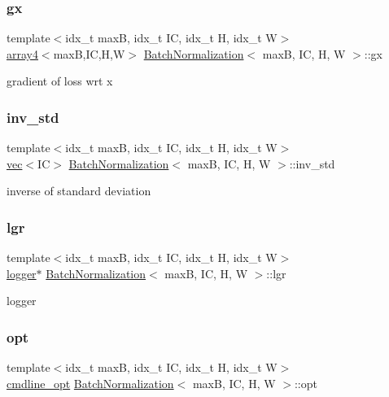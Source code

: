 \subsubsection{\texorpdfstring{gx}{gx}}
{\footnotesize\ttfamily template$<$idx\+\_\+t maxB, idx\+\_\+t IC, idx\+\_\+t H, idx\+\_\+t W$>$ \\
\hyperlink{structarray4}{array4}$<$maxB,IC,H,W$>$ \hyperlink{structBatchNormalization}{Batch\+Normalization}$<$ maxB, IC, H, W $>$\+::gx}

gradient of loss wrt x \mbox{\label{structBatchNormalization_a32b254c9c4ceb4dc1c952d93851d120f}} 
\subsubsection{\texorpdfstring{inv\+\_\+std}{inv\_std}}
{\footnotesize\ttfamily template$<$idx\+\_\+t maxB, idx\+\_\+t IC, idx\+\_\+t H, idx\+\_\+t W$>$ \\
\hyperlink{structvec}{vec}$<$IC$>$ \hyperlink{structBatchNormalization}{Batch\+Normalization}$<$ maxB, IC, H, W $>$\+::inv\+\_\+std}

inverse of standard deviation \mbox{\label{structBatchNormalization_a160b18a54054d8afa967acc842dd9cf3}} 
\subsubsection{\texorpdfstring{lgr}{lgr}}
{\footnotesize\ttfamily template$<$idx\+\_\+t maxB, idx\+\_\+t IC, idx\+\_\+t H, idx\+\_\+t W$>$ \\
\hyperlink{structlogger}{logger}$\ast$ \hyperlink{structBatchNormalization}{Batch\+Normalization}$<$ maxB, IC, H, W $>$\+::lgr}

logger \mbox{\label{structBatchNormalization_a9fb30ad9f94c91d4a4d4ab9d3801cba4}} 
\subsubsection{\texorpdfstring{opt}{opt}}
{\footnotesize\ttfamily template$<$idx\+\_\+t maxB, idx\+\_\+t IC, idx\+\_\+t H, idx\+\_\+t W$>$ \\
\hyperlink{structcmdline__opt}{cmdline\+\_\+opt} \hyperlink{structBatchNormalization}{Batch\+Normalization}$<$ maxB, IC, H, W $>$\+::opt}

